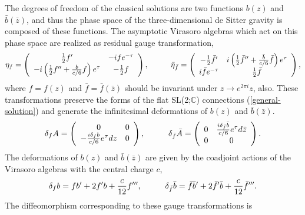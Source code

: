 \documentclass[a4paper,11pt]{article}
\begin{document}
The degrees of freedom of the classical solutions are two functions 
$b(z)$ and $\bar{b}(\bar{z})$, and thus the phase space 
of the three-dimensional de Sitter gravity is composed of these
functions.
The asymptotic Virasoro algebras which act on this phase space are 
realized as residual gauge transformation, 
\begin{equation}
\eta_f=\left(\begin{array}{cc}
	\frac{1}{2}f' & -ife^{-\tau} \\
         -i\left(\frac{1}{2}f''+\frac{b}{c/6}f\right)e^{\tau} & 
           -\frac{1}{2}f
	      \end{array}\right), 
 \hspace{10mm}
\bar{\eta}_{\bar{f}}=\left(\begin{array}{cc}
    -\frac{1}{2}\bar{f}' & 
      i\left(\frac{1}{2}\bar{f}''+\frac{\bar{b}}{c/6}\bar{f}\right)e^{\tau} \\
    i\bar{f}e^{-\tau} & 
      \frac{1}{2}\bar{f}
	      \end{array}\right),
\end{equation}
where $f=f(z)$ and $\bar{f}=\bar{f}(\bar{z})$ should be invariant under
$z\rightarrow e^{2\pi i}z$, also.
These transformations preserve the forms of the flat SL(2;$\mathbb{C}$) 
connections (\ref{general-solution}) and generate the infinitesimal 
deformations of $b(z)$ and $\bar{b}(\bar{z})$.
\begin{eqnarray}
\delta_f A=\left(
      \begin{array}{cc}
	 0 & 0 \\
	 -\frac{i\delta_f b}{c/6}e^\tau dz & 0
      \end{array}\right), 
 \hspace{10mm}
\delta_{\bar{f}} \bar{A}=\left(
      \begin{array}{cc}
   	 0 & \frac{i\delta_{\bar{f}}\bar{b}}{c/6} e^\tau d\bar{z} \\
         0 & 0
      \end{array}\right).
\end{eqnarray}
The deformations of $b(z)$ and $\bar{b}(\bar{z})$ are given 
by the coadjoint actions of the Virasoro algebras with the central
charge $c$,
\begin{equation}
\label{coadjoint-action}
\delta_f b=fb'+2f'b+\frac{c}{12}f''', 
 \hspace{10mm}
\delta_{\bar{f}} \bar{b}=\bar{f}\bar{b}'
     +2\bar{f}'\bar{b}+\frac{c}{12}\bar{f}'''.
\end{equation}
The diffeomorphism corresponding to these gauge transformations is  
\end{document}
